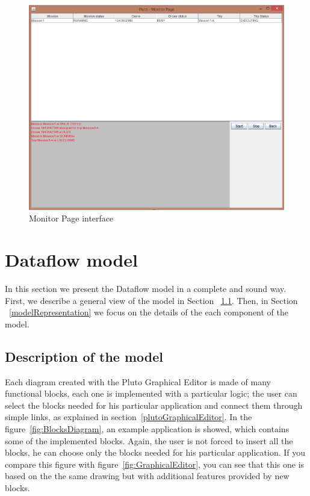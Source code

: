 \begin{figure}[htb]
  \centering
  \includegraphics[width=\linewidth]{pictures/MonitorPage.png}
  \caption{Monitor Page interface}
  \label{fig:MonitorPage}
\end{figure}

\newpage

\section{Dataflow model}\label{dataFlow}

In this section we present the Dataflow model in a complete and sound way.
First, we describe a general view of the model in Section ~\ref{descriprionOfModel}. Then, in Section ~\ref{modelRepresentation} we focus on the details of the each component of the model.


\subsection{Description of the model}
\label{descriprionOfModel}

Each diagram created with the Pluto Graphical Editor is made of many functional blocks, each one is implemented with a particular logic; the user can select the blocks needed for his particular application and connect them through simple links, as explained in section~\ref{plutoGraphicalEditor}.
In the figure~\ref{fig:BlocksDiagram}, an example application is showed, which contains some of the implemented blocks.
Again, the user is not forced to insert all the blocks, he can choose only the blocks needed for his particular application.
If you compare this figure with figure~\ref{fig:GraphicalEditor}, you can see that this one is based on the the same drawing but with additional features provided by new blocks.
\\
\\
\\

